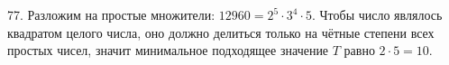 77. Разложим на простые множители: $12960=2^5\cdot3^4\cdot5.$ Чтобы число являлось квадратом целого числа, оно должно делиться только на чётные степени всех простых чисел, значит минимальное подходящее значение $T$ равно $2\cdot5=10.$\\
